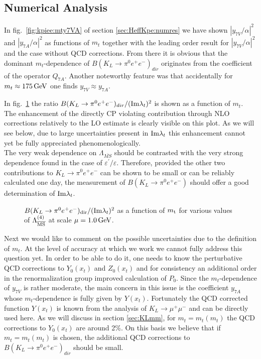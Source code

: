 \subsection{Numerical Analysis}
\label{sec:KLpee:Numerical}

In fig.\ \ref{fig:kpiee:mty7VA} of section \ref{sec:HeffKpe:numres} we
have shown $|y_{7V}/\alpha|^2$ and $|y_{7A}/\alpha|^2$ as functions of
$m_t$ together with the leading order result for $|y_{7V}/\alpha|^2$
and the case without QCD corrections. From there it is obvious that the
dominant $m_t$-dependence of $B(K_L\to\pi^0e^+e^-)_{dir}$ originates
from the coefficient of the operator $Q_{7A}$. Another noteworthy
feature was that accidentally for $m_t\approx 175\, {\rm GeV}$ one finds
$y_{7V}\approx y_{7A}$.

In fig.\ \ref{fig:mtbrimltAll} the ratio
$B(K_L\to\pi^0e^+e^-)_{dir}/({\rm Im}\lambda_t)^2$
is shown as a function of $m_t$. The enhancement of the directly
CP violating contribution through NLO corrections relatively to the
LO estimate is clearly visible on this plot. As we will see below,
due to large uncertainties present in ${\rm Im}\lambda_t$ this
enhancement cannot yet be fully appreciated phenomenologically.
\\
The very weak dependence on $\Lambda_{\overline{MS}}$ should be
contrasted with the very strong dependence found in the case of
$\varepsilon^\prime/\varepsilon$. Therefore, provided the other two
contributions to $K_L\to\pi^0e^+e^-$ can be shown to be small or can
be reliably calculated one day, the measurement of
$B(K_L\to\pi^0e^+e^-)$ should offer a good determination of
${\rm Im}\lambda_t$.

\begin{figure}[hbt]
\vspace{0.10in}
\centerline{
\epsfysize=5in
}
\vspace{0.10in}
\caption[]{
$B(K_L \to \pi^0 e^+e^-)_{\rm dir}/({\rm Im}\lambda_t)^2$
as a function of $m_{\rm t}$ for various values of $\Lambda_{\overline{\rm MS}}^{(4)}$ at scale
$\mu =1.0\, {\rm GeV} $.
\label{fig:mtbrimltAll}}
\end{figure}

Next we would like to comment on the possible uncertainties due to the
definition of $m_t$. At the level of accuracy at which we work we
cannot fully address this question yet. In order to be able to do it,
one needs to know the perturbative QCD corrections to $Y_0(x_t)$ and
$Z_0(x_t)$ and for consistency an additional order in the
renormalization group improved calculation of $P_0$.  Since the
$m_t$-dependence of $y_{7V}$ is rather moderate, the main concern in
this issue is the coefficient $y_{7A}$ whose $m_t$-dependence is fully
given by $Y(x_t)$. Fortunately the QCD corrected function $Y(x_t)$ is
known from the analysis of $K_L\to\mu^+\mu^-$ and can be directly used
here. As we will discuss in section \ref{sec:KLmm}, for $m_t=m_t(m_t)$
the QCD corrections to $Y_0(x_t)$ are around 2\%. On this basis we
believe that if $m_t=m_t(m_t)$ is chosen, the additional  QCD
corrections to $B(K_L\to\pi^0e^+e^-)_{dir}$ should be small.

